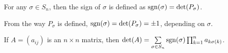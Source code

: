 \documentclass[../main.tex]{subfiles}
\begin{document}
\begin{definition}
For any $\sigma\in S_n$, then the sign of $\sigma$ is defined as $\operatorname{sgn}(\sigma) = \det(P_{\sigma})$.
\end{definition}

\begin{remark}
From the way $P_{\sigma}$ is defined, $\operatorname{sgn}(\sigma) = \det(P_{\sigma}) = \pm 1$, depending on $\sigma$.
\end{remark}

\begin{theorem}
If $A=(a_{ij})$ is an $n\times n$ matrix, then $\det(A) = \underset{\sigma \in S_n}\sum \operatorname{sgn}(\sigma) \prod_{k=1}^{n} a_{k\sigma(k)}$.
\end{theorem}
\end{document}

